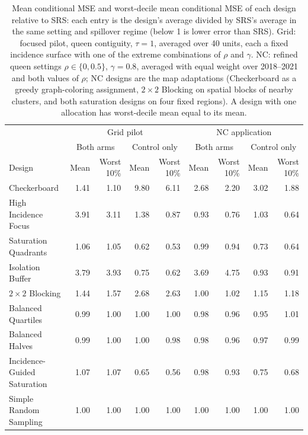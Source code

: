 \documentclass[11pt]{article}
\begin{document}
\begin{table}[!htb]

\footnotesize
\centering
\setlength{\tabcolsep}{4pt}

\caption{Mean conditional MSE and worst-decile mean conditional MSE of each design relative to SRS: each entry is the design's average divided by SRS's average in the same setting and spillover regime (below 1 is lower error than SRS). Grid: focused pilot, queen contiguity, $\tau=1$, averaged over 40 units, each a fixed incidence surface with one of the extreme combinations of $\rho$ and $\gamma$. NC: refined queen settings $\rho\in\{0,0.5\}$, $\gamma=0.8$, averaged with equal weight over 2018--2021 and both values of $\rho$; NC designs are the map adaptations (Checkerboard as a greedy graph-coloring assignment, $2\times2$ Blocking on spatial blocks of nearby clusters, and both saturation designs on four fixed regions). A design with one allocation has worst-decile mean equal to its mean.}
\label{tab:downside}

\begin{tabular}{lrrrrrrrr}

\toprule
& \multicolumn{4}{c}{Grid pilot} & \multicolumn{4}{c}{NC application} \\
& \multicolumn{2}{c}{Both arms} & \multicolumn{2}{c}{Control only} & \multicolumn{2}{c}{Both arms} & \multicolumn{2}{c}{Control only} \\
Design & Mean & Worst 10\% & Mean & Worst 10\% & Mean & Worst 10\% & Mean & Worst 10\% \\

\midrule
Checkerboard & 1.41 & 1.10 & 9.80 & 6.11 & 2.68 & 2.20 & 3.02 & 1.88 \\
High Incidence Focus & 3.91 & 3.11 & 1.38 & 0.87 & 0.93 & 0.76 & 1.03 & 0.64 \\
Saturation Quadrants & 1.06 & 1.05 & 0.62 & 0.53 & 0.99 & 0.94 & 0.73 & 0.64 \\
Isolation Buffer & 3.79 & 3.93 & 0.75 & 0.62 & 3.69 & 4.75 & 0.93 & 0.91 \\
$2\times2$ Blocking & 1.44 & 1.57 & 2.68 & 2.63 & 1.00 & 1.02 & 1.15 & 1.18 \\
Balanced Quartiles & 0.99 & 1.00 & 1.00 & 1.00 & 0.98 & 0.96 & 0.95 & 1.01 \\
Balanced Halves & 0.99 & 1.00 & 1.00 & 0.98 & 0.98 & 0.96 & 0.97 & 0.99 \\
Incidence-Guided Saturation & 1.07 & 1.07 & 0.65 & 0.56 & 0.98 & 0.93 & 0.75 & 0.68 \\
Simple Random Sampling & 1.00 & 1.00 & 1.00 & 1.00 & 1.00 & 1.00 & 1.00 & 1.00 \\

\bottomrule

\end{tabular}

\end{table}
\end{document}
